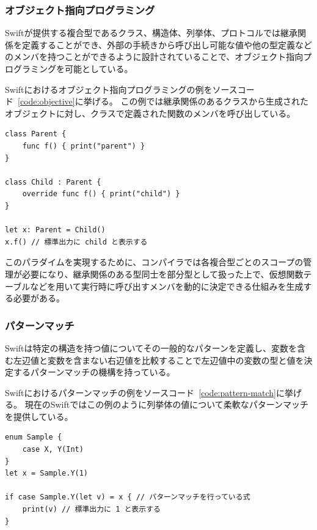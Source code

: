\subsubsection{オブジェクト指向プログラミング}

Swiftが提供する複合型であるクラス、構造体、列挙体、プロトコルでは継承関係を定義することができ、外部の手続きから呼び出し可能な値や他の型定義などのメンバを持つことができるように設計されていることで、オブジェクト指向プログラミングを可能としている。

Swiftにおけるオブジェクト指向プログラミングの例をソースコード~\ref{code:objective}に挙げる。
この例では継承関係のあるクラスから生成されたオブジェクトに対し、クラスで定義された関数のメンバを呼び出している。

\begin{lstlisting}[caption=Swiftにおけるオブジェクト指向プログラミングの例, label=code:objective]
class Parent {
    func f() { print("parent") }
}

class Child : Parent {
    override func f() { print("child") }
}

let x: Parent = Child()
x.f() // 標準出力に child と表示する
\end{lstlisting}

このパラダイムを実現するために、コンパイラでは各複合型ごとのスコープの管理が必要になり、継承関係のある型同士を部分型として扱った上で、仮想関数テーブルなどを用いて実行時に呼び出すメンバを動的に決定できる仕組みを生成する必要がある。

\subsubsection{パターンマッチ}

Swiftは特定の構造を持つ値についてその一般的なパターンを定義し、変数を含む左辺値と変数を含まない右辺値を比較することで左辺値中の変数の型と値を決定するパターンマッチの機構を持っている。

Swiftにおけるパターンマッチの例をソースコード~\ref{code:pattern-match}に挙げる。
現在のSwiftではこの例のように列挙体の値について柔軟なパターンマッチを提供している。

\begin{lstlisting}[caption=Swiftにおけるパターンマッチの例, label=code:pattern-match]
enum Sample {
    case X, Y(Int)
}
let x = Sample.Y(1)

if case Sample.Y(let v) = x { // パターンマッチを行っている式
    print(v) // 標準出力に 1 と表示する
}
\end{lstlisting}

